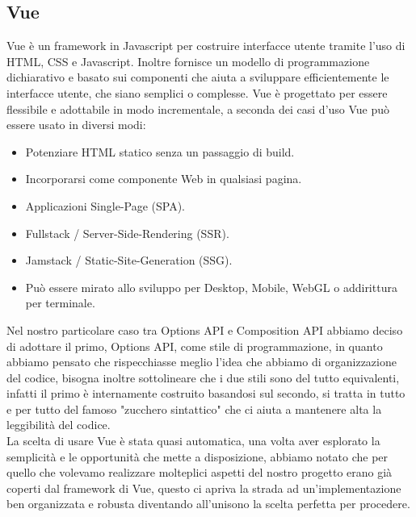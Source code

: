 \documentclass{article}
\begin{document}
\subsection{Vue}
Vue è un framework in Javascript per costruire interfacce utente tramite l'uso di HTML, CSS e Javascript. Inoltre fornisce un modello di programmazione dichiarativo e basato sui componenti che aiuta a sviluppare efficientemente le interfacce utente, che siano semplici o complesse. Vue è progettato per essere flessibile e adottabile in modo incrementale, a seconda dei casi d'uso Vue può essere usato in diversi modi:
\begin{itemize}
	\item Potenziare HTML statico senza un passaggio di build.
	\item Incorporarsi come componente Web in qualsiasi pagina.
	\item Applicazioni Single-Page (SPA).
	\item Fullstack / Server-Side-Rendering (SSR).
	\item Jamstack / Static-Site-Generation (SSG).
	\item Può essere mirato allo sviluppo per Desktop, Mobile, WebGL o addirittura per terminale.
\end{itemize}
Nel nostro particolare caso tra Options API e Composition API abbiamo deciso di adottare il primo, Options API, come stile di programmazione, in quanto abbiamo pensato che rispecchiasse meglio l'idea che abbiamo di organizzazione del codice, bisogna inoltre sottolineare che i due stili sono del tutto equivalenti, infatti il primo è internamente costruito basandosi sul secondo, si tratta in tutto e per tutto del famoso "zucchero sintattico" che ci aiuta a mantenere alta la leggibilità del codice.\\
La scelta di usare Vue è stata quasi automatica, una volta aver esplorato la semplicità e le opportunità che mette a disposizione, abbiamo notato che per quello che volevamo realizzare molteplici aspetti del nostro progetto erano già coperti dal framework di Vue, questo ci apriva la strada ad un'implementazione ben organizzata e robusta diventando all'unisono la scelta perfetta per procedere.
\end{document}
